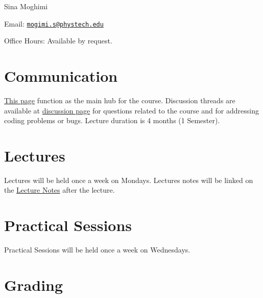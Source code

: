 \documentclass[
]{book}
\begin{document}
Sina Moghimi

Email: \href{mailto:mogimi.s@phystech.edu}{\nolinkurl{mogimi.s@phystech.edu}}

Office Hours: Available by request.

\hypertarget{communication}{%
\section{Communication}\label{communication}}

\href{https://neuralincendio.github.io}{This page} function as the main hub for the course. Discussion threads are available at \href{https://github.com/NeuralIncendio/neuralIncendio.github.io/discussions/}{discussion page} for questions related to the course and for addressing coding problems or bugs. Lecture duration is 4 months (1 Semester).

\hypertarget{lectures}{%
\section{Lectures}\label{lectures}}

Lectures will be held once a week on Mondays. Lectures notes will be linked on the \protect\hyperlink{Lecture_Notes}{Lecture Notes} after the lecture.

\hypertarget{practical-sessions}{%
\section{Practical Sessions}\label{practical-sessions}}

Practical Sessions will be held once a week on Wednesdays.

\hypertarget{grading}{%
\section{Grading}\label{grading}}
\end{document}
